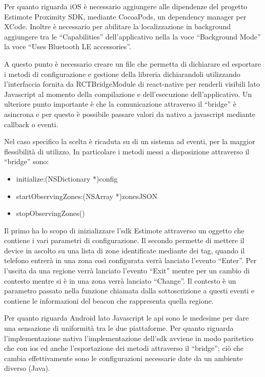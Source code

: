 Per quanto riguarda iOS è necessario aggiungere alle dipendenze del progetto Estimote Proximity SDK, mediante CocoaPods, un dependency manager per XCode. Inoltre è necessario per abilitare la localizzazione in background aggiungere tra le “Capabilities” dell’applicativo nella la voce “Background Mode” la voce “Uses Bluetooth LE accessories”. \vspace{5mm}

A questo punto è necessario creare un file che permetta di dichiarare ed esportare i metodi di configurazione e gestione della libreria dichiarandoli utilizzando l’interfaccia fornita da RCTBridgeModule  di react-native per renderli visibili lato Javascript al momento della compilazione e dell’esecuzione dell’applicativo. Un ulteriore punto importante è che la comunicazione attraverso il “bridge” è asincrona e per questo è possibile passare valori da nativo a javascript mediante callback o eventi. \vspace{5mm}

Nel caso specifico la scelta è ricaduta su di un sistema ad eventi, per la maggior flessibilità di utilizzo. In particolare i metodi messi a disposizione attraverso il “bridge” sono:
\begin{itemize}
	\item initialize:(NSDictionary *)config
	\item startObservingZones:(NSArray *)zonesJSON
	\item stopObservingZones()
\end{itemize}
	\vspace{5mm}
Il primo ha lo scopo di inizializzare l’sdk Estimote attraverso un oggetto che contiene i vari parametri di configurazione. Il secondo permette di mettere il device in ascolto su una lista di zone identificate mediante dei tag, quando il telefono entrerà in una zona così configurata verrà lanciato l’evento “Enter”. Per l’uscita da una regione verrà lanciato l’evento “Exit” mentre per un cambio di contesto mentre si è in una zona verrà lanciato “Change”. Il contesto è un parametro passato nella funzione chiamata dalla sottoscrizione a questi eventi e contiene le informazioni del beacon che rappresenta quella regione.\vspace{5mm}

Per quanto riguarda Android lato Javascript le api sono le medesime per dare una sensazione di uniformità tra le due piattaforme. Per quanto riguarda l’implementazione nativa l’implementazione dell’sdk avviene in modo paritetico che con ios ed anche l’esportazione dei metodi attraverso il “bridge”; ciò che cambia effettivamente sono le configurazioni necessarie date da un ambiente diverso (Java).\vspace{5mm}

